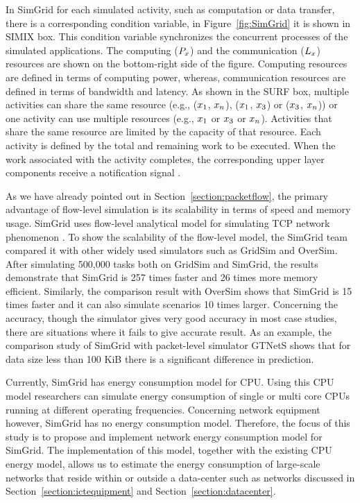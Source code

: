 In SimGrid for each simulated activity, such as computation or data transfer, there is a corresponding condition variable, in Figure~\ref{fig:SimGrid} it is shown in SIMIX box. This condition variable synchronizes the concurrent processes of the simulated applications. The computing (\($$P_{x}$$\)) and the communication (\($$L_{x}$$\)) resources are shown on the bottom-right side of the figure. Computing resources are defined in terms of computing power, whereas, communication resources are defined in terms of bandwidth and latency. As shown in the SURF box, multiple activities can share the same resource (e.g., (\($$x_{1}$$\), \($$x_{n}$$\)), (\($$x_{1}$$\), \($$x_{3}$$\)) or (\($$x_{3}$$\), \($$x_{n}$$\))) or one activity can use multiple resources (e.g., \($$x_{1}$$\) or \($$x_{3}$$\) or  \($$x_{n}$$\)). Activities that share the same resource are limited by the capacity of that resource. Each activity is defined by the total and remaining work to be executed. When the work associated with the activity completes, the corresponding upper layer components receive a notification signal \cite{DBLP:journals/jpdc/CasanovaGLQS14}.

As we have already pointed out in Section~\ref{section:packetflow}, the primary advantage of flow-level simulation is its scalability in terms of speed and memory usage. SimGrid uses flow-level analytical model for simulating TCP network phenomenon \cite{DBLP:journals/jpdc/CasanovaGLQS14}. To show the scalability of the flow-level model, the SimGrid team compared it with other widely used simulators such as GridSim and OverSim. After simulating 500,000 tasks both on GridSim and SimGrid, the results demonstrate that SimGrid is 257 times faster and 26 times more memory efficient. Similarly, the comparison result with OverSim shows that SimGrid is 15 times faster and it can also simulate scenarios 10 times larger. Concerning the accuracy, though the simulator gives very good accuracy in most case studies, there are situations where it fails to give accurate result. As an example, the comparison study of SimGrid with packet-level simulator GTNetS shows that for data size less than 100 KiB there is a significant difference in prediction. 

Currently, SimGrid has energy consumption model for CPU. Using this CPU model researchers can simulate energy consumption of single or multi core CPUs running at different operating frequencies. Concerning network equipment however, SimGrid has no energy consumption model. Therefore, the focus of this study is to propose and implement network energy consumption model for SimGrid. The implementation of this model, together with the existing CPU energy model, allows us to estimate the energy consumption of large-scale networks that reside within or outside a data-center such as networks discussed in Section~\ref{section:ictequipment} and Section~\ref{section:datacenter}.


